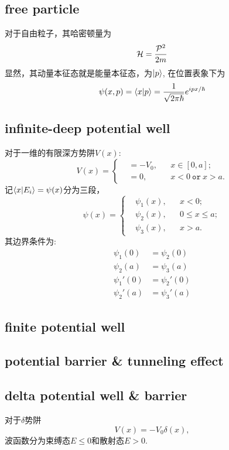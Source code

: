 \subsection{free particle}
对于自由粒子，其哈密顿量为
\begin{equation}
    \mathcal{H}=\frac{\mathcal{P}^2}{2m}
\end{equation}
显然，其动量本征态就是能量本征态，为$\left|p\right>$, 在位置表象下为
\begin{equation}
    \psi(x,p)=\left<x\middle|p\right>=\frac{1}{\sqrt{2\pi\hbar}} e^{ipx/\hbar}
\end{equation}
\subsection{infinite-deep potential well}
对于一维的有限深方势阱$V(x)$:
\begin{equation}
    V(x)=\left\lbrace\begin{aligned}
        &=-V_0, && x\in[0,a];\\
        &=0, && x <0 \ \mathtt{or}\  x>a.
    \end{aligned}\right.
\end{equation}
记$\left<x\middle|E_i\right>=\psi(x)$分为三段，
\begin{equation}
    \psi(x)=\left\lbrace\begin{aligned}
        &\psi_1(x),&&x<0;\\
        &\psi_2(x),&&0\leq x\leq a;\\
        &\psi_3(x),&&x>a.
    \end{aligned}\right.
\end{equation}
其边界条件为: 
\begin{align}
    \psi_1(0)&=\psi_2(0)\\
    \psi_2(a)&=\psi_3(a)\\
    \psi_1'(0)&=\psi_2'(0)\\
    \psi_2'(a)&=\psi_3'(a)
\end{align}
\subsection{finite potential well}
\subsection{potential barrier \& tunneling effect}
\subsection{delta potential well \& barrier}
对于$\delta$势阱
\begin{equation}
    V(x)=-V_0\delta(x),
\end{equation}
波函数分为束缚态$E\le 0$和散射态$E>0$.

